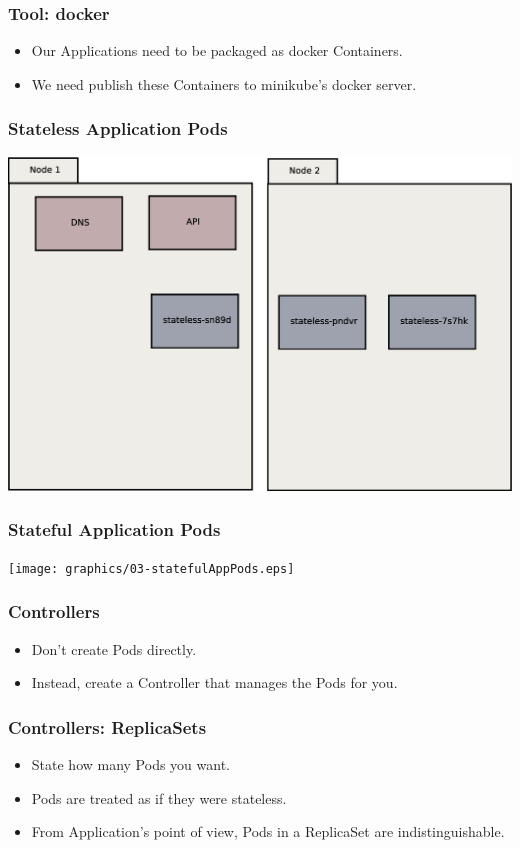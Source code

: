 \documentclass{beamer}
\begin{document}
\begin{frame}
    \frametitle{Tool: docker\footnotemark}
    \begin{itemize}
        \item Our Applications need to be packaged as docker Containers.
        \item We need publish these Containers to minikube's docker server.
    \end{itemize}
\end{frame}

\begin{frame}
    \frametitle{Stateless Application Pods}
    \includegraphics[width=\textwidth,height=0.85\textheight,keepaspectratio]{graphics/02-statelessAppPods.eps}
\end{frame}

\begin{frame}
    \frametitle{Stateful Application Pods}
    \texttt{[image: graphics/03-statefulAppPods.eps]}
\end{frame}

\begin{frame}
    \frametitle{Controllers}
    \begin{itemize}
        \item Don't create Pods directly.
        \item Instead, create a Controller that manages the Pods for you.
    \end{itemize}
\end{frame}

\begin{frame}
    \frametitle{Controllers: ReplicaSets}
    \begin{itemize}
        \item State how many Pods you want.\pause
        \item Pods are treated as if they were stateless.\pause
        \item From Application's point of view, Pods in a ReplicaSet are indistinguishable.
    \end{itemize}
\end{frame}
\end{document}
